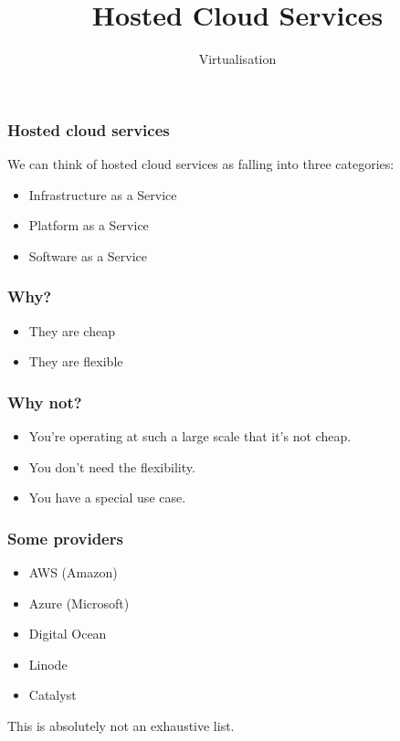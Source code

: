 \documentclass[10pt]{beamer}
\title{Hosted Cloud Services}
\author[ID720]{Virtualisation}
\institute[Otago Polytechnic]{
  Otago Polytechnic \\
  Dunedin, New Zealand \\
}
\date{}
\begin{document}
\begin{frame}[plain]
  \titlepage
\end{frame}


\begin{frame}
  \frametitle{Hosted cloud services}
  
  We can think of hosted cloud services as falling into three categories:
   
   \begin{itemize}
     \item Infrastructure as a Service
     \item Platform as a Service
     \item Software as a Service
     \end{itemize}
\end{frame}
 
\begin{frame}
  \frametitle{Why?}
  
   
   \begin{itemize}
     \item They are cheap
     \item They are flexible
     \end{itemize}
\end{frame}
  
\begin{frame}
  \frametitle{Why not?}
  
   
   \begin{itemize}
     \item You're operating at such a large scale that it's not cheap.
     \item You don't need the flexibility.
     \item You have a special use case.
     \end{itemize}
\end{frame}

\begin{frame}
  \frametitle{Some providers}
  
   
   \begin{itemize}
     \item AWS (Amazon)
     \item Azure (Microsoft)
     \item Digital Ocean
     \item Linode
     \item Catalyst
     \end{itemize}
     
     This is absolutely not an exhaustive list.
\end{frame}
\end{document}
